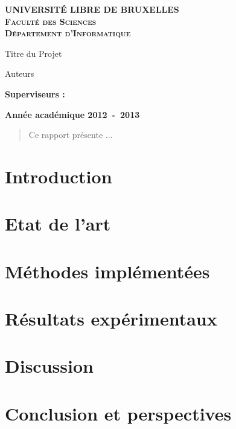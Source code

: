 \documentclass[a4paper,10pt]{report}
\begin{document}
\begin{titlepage}
\begin{center}
\textbf{\textsc{UNIVERSIT\'E LIBRE DE BRUXELLES}}\\
\textbf{\textsc{Faculté des Sciences}}\\
\textbf{\textsc{Département d'Informatique}}
\vfill{}\vfill{}
\begin{center}{\Huge Titre du Projet}\end{center}{\Huge \par}
\begin{center}{\large Auteurs}\end{center}{\Huge \par}
\vfill{}\vfill{}
\begin{flushleft}{\large \textbf{Superviseurs :}}\hfill{}\end{flushleft}{\large\par}
\vfill{}\vfill{}\enlargethispage{3cm}
\textbf{Année académique 2012~-~2013}
\end{center}
\end{titlepage}

\begin{abstract}
Ce rapport présente ...
\end{abstract}


\tableofcontents


\chapter{Introduction}

\chapter{Etat de l'art}

\cite{spampinato2008detecting,trucco2006video}

\chapter{Méthodes implémentées}

\chapter{Résultats expérimentaux}

\chapter{Discussion}

\chapter{Conclusion et perspectives}




\end{document}
